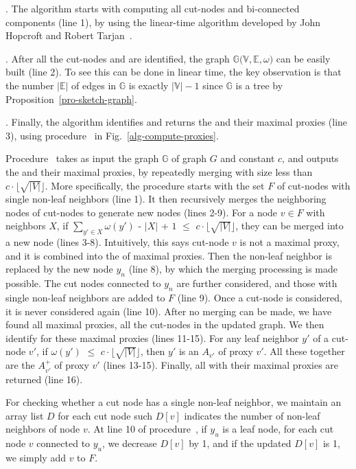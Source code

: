 .
%
The algorithm starts with computing all cut-nodes and bi-connected components (line 1), by using the linear-time algorithm developed by
John Hopcroft and Robert Tarjan~\cite{CormenLRS01,HopcroftT73-cut-nodes}.

.
%
After all the cut-nodes and \bccs are identified, the \bcsketch graph $\mathbb{G(V, E}, \omega)$ can be easily built (line 2).
To see this can be done in linear time, the key observation is that the number $|\mathbb{E}|$ of edges in $\mathbb{G}$ is
exactly $|\mathbb{V}| - 1$ since $\mathbb{G}$ is a tree by Proposition~\ref{pro-sketch-graph}.

.
%
Finally, the algorithm identifies and returns the \dras and their maximal proxies (line 3), using
procedure~ in Fig.~\ref{alg-compute-proxies}.

Procedure~ takes as input the \bcsketch graph $\mathbb{G}$ of graph $G$ and constant $c$,
and outputs the \dras and their maximal proxies, by repeatedly merging \bccs with size less than $c\cdot\lfloor\sqrt{|V|}\rfloor$.
More specifically, the procedure starts with the set $F$ of cut-nodes with single non-leaf neighbors (line 1).
It then recursively merges the neighboring \bc nodes of cut-nodes to generate new \bc nodes (lines 2-9).
For a node $v\in F$ with neighbors $X$, if $\sum_{y'\in X}\omega(y')$ - $|X|$ + $1$ $\le$ $c\cdot\lfloor\sqrt{|V|}\rfloor$,
they can be merged into a new \bc node (lines 3-8). Intuitively, this says cut-node $v$ is not a maximal proxy, and it is combined into the \dras of maximal proxies. Then the non-leaf neighbor is replaced by the new \bc node $y_n$ (line 8), by which the merging processing is made possible.
The cut nodes connected to $y_{n}$ are further considered, and those with single non-leaf neighbors are added to $F$ (line 9).
%
Once a cut-node is considered, it is never considered again (line 10).
%
After no merging can be made, we have found all maximal proxies, \ie all the cut-nodes in the updated \bcsketch graph.
We then identify \dras for these maximal proxies (lines 11-15). For any leaf neighbor $y'$ of a cut-node $v'$,
if $\omega(y')$ $\le$ $c\cdot\lfloor\sqrt{|V|}\rfloor$, then $y'$ is an $A_{v'}$ of proxy $v'$.
All these together are the $A^+_{v'}$ of proxy $v'$ (lines 13-15). Finally, all \dras with their maximal proxies are returned (line 16).

For checking whether a cut node has a single non-leaf neighbor, we maintain an array list $D$ for each cut node such $D[v]$ indicates the number of non-leaf neighbors of node $v$. At line 10 of procedure~, if $y_{u}$ is a leaf node, for each cut node $v$ connected to $y_{u}$, we decrease $D[v]$ by 1, and if the updated $D[v]$ is 1, we simply add $v$ to $F$.

